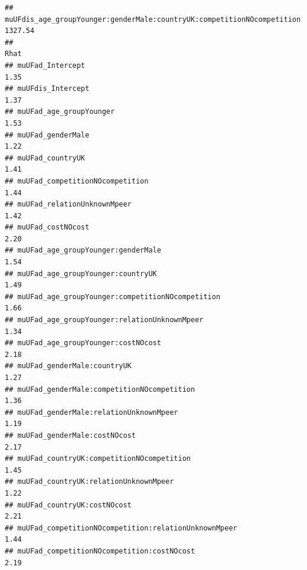 \documentclass[
]{article}
\begin{document}
\begin{verbatim}
## muUFdis_age_groupYounger:genderMale:countryUK:competitionNOcompetition:relationUnknownMpeer:costNOcost  1327.54
##                                                                                                        Rhat
## muUFad_Intercept                                                                                       1.35
## muUFdis_Intercept                                                                                      1.37
## muUFad_age_groupYounger                                                                                1.53
## muUFad_genderMale                                                                                      1.22
## muUFad_countryUK                                                                                       1.41
## muUFad_competitionNOcompetition                                                                        1.44
## muUFad_relationUnknownMpeer                                                                            1.42
## muUFad_costNOcost                                                                                      2.20
## muUFad_age_groupYounger:genderMale                                                                     1.54
## muUFad_age_groupYounger:countryUK                                                                      1.49
## muUFad_age_groupYounger:competitionNOcompetition                                                       1.66
## muUFad_age_groupYounger:relationUnknownMpeer                                                           1.34
## muUFad_age_groupYounger:costNOcost                                                                     2.18
## muUFad_genderMale:countryUK                                                                            1.27
## muUFad_genderMale:competitionNOcompetition                                                             1.36
## muUFad_genderMale:relationUnknownMpeer                                                                 1.19
## muUFad_genderMale:costNOcost                                                                           2.17
## muUFad_countryUK:competitionNOcompetition                                                              1.45
## muUFad_countryUK:relationUnknownMpeer                                                                  1.22
## muUFad_countryUK:costNOcost                                                                            2.21
## muUFad_competitionNOcompetition:relationUnknownMpeer                                                   1.44
## muUFad_competitionNOcompetition:costNOcost                                                             2.19

\end{verbatim}
\end{document}
